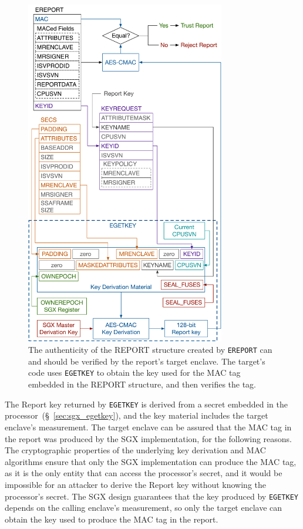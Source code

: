 \begin{figure}[hbt!]
  \centering
  \includegraphics[width=87mm]{figures/sgx_ereport_check.pdf}
  \caption{
    The authenticity of the REPORT structure created by \texttt{EREPORT} can and
    should be verified by the report's target enclave. The target's code uses
    \texttt{EGETKEY} to obtain the key used for the MAC tag embedded in the
    REPORT structure, and then verifies the tag.
  }
  \label{fig:sgx_ereport_check}
\end{figure}

The Report key returned by \texttt{EGETKEY} is derived from a secret embedded
in the processor~(\S~\ref{sec:sgx_egetkey}), and the key material includes the
target enclave's measurement. The target enclave can be assured that the MAC
tag in the report was produced by the SGX implementation, for the following
reasons. The cryptographic properties of the underlying key derivation and
MAC algorithms ensure that only the SGX implementation can produce the MAC tag,
as it is the only entity that can access the processor's secret, and it would be
impossible for an attacker to derive the Report key without knowing the
processor's secret. The SGX design guarantees that the key produced by
\texttt{EGETKEY} depends on the calling enclave's measurement, so only the
target enclave can obtain the key used to produce the MAC tag in the report.

